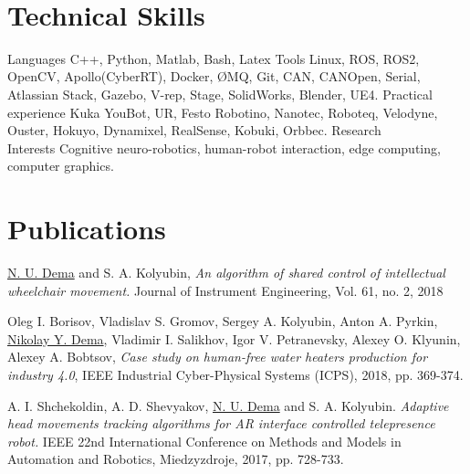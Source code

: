 \documentclass{ncv}
\begin{document}
\ 

\section{Technical Skills}
\begin{two_col_entry_list}
	\entry
		{Languages}
		{C++, Python, Matlab, Bash, Latex}
	\entry
		{Tools}
		{Linux, ROS, ROS2, OpenCV, Apollo(CyberRT), Docker, {\O}MQ, Git, CAN, CANOpen, Serial,  Atlassian Stack, Gazebo, V-rep, Stage, SolidWorks, Blender, UE4.}
	\entry
		{Practical\\ experience}
		{
		Kuka YouBot, UR, Festo Robotino, Nanotec, Roboteq, Velodyne, Ouster, Hokuyo, Dynamixel, RealSense, Kobuki, Orbbec.}
	\entry
		{Research\\ Interests}
		{Cognitive neuro-robotics, human-robot interaction, edge computing, computer graphics.}
\end{two_col_entry_list}


\section{Publications}
	\begin{pub_itemize}
        \item \underline{N. U. Dema} and S. A. Kolyubin, \textit{An algorithm of shared control of intellectual wheelchair movement.} Journal of Instrument Engineering, Vol. 61, no. 2, 2018
            
        \item Oleg I. Borisov, Vladislav S. Gromov, Sergey A. Kolyubin, Anton A. Pyrkin, \underline{Nikolay Y. Dema}, Vladimir I. Salikhov, Igor V. Petranevsky, Alexey O. Klyunin,  Alexey A. Bobtsov, \textit{Case study on human-free water heaters production for industry 4.0}, IEEE Industrial Cyber-Physical Systems (ICPS), 2018, pp. 369-374.
            
        \item A. I. Shchekoldin, A. D. Shevyakov, \underline{N. U. Dema} and S. A. Kolyubin. \textit{Adaptive head movements tracking algorithms for AR interface controlled telepresence robot.} IEEE 22nd International Conference on Methods and Models in Automation and Robotics, Miedzyzdroje, 2017, pp. 728-733.
    \end{pub_itemize}
         
         
\end{document}
